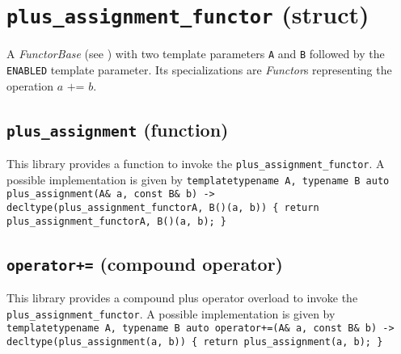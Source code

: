 
\section{\texttt{plus\_assignment\_functor} (struct)}
A \textit{FunctorBase} (see \cite{functors}) with two template parameters \texttt{A} and \texttt{B} followed by the \texttt{ENABLED} template parameter.
Its specializations are \textit{Functor}s representing the operation $\textit{a += b}$.

\subsection{\texttt{plus\_assignment} (function)}
This library provides a function to invoke the \texttt{plus\_assignment\_functor}.
A possible implementation is given by\newline
\texttt{template\textlangle typename A, typename B\textrangle\newline
auto\newline
plus\_assignment(A\& a, const B\& b)\newline
-> decltype(plus\_assignment\_functor\textlangle A, B\textrangle()(a, b))\newline
\{ return plus\_assignment\_functor\textlangle A, B\textrangle()(a, b); \}}

\subsection{\texttt{operator+=} (compound operator)}
This library provides a compound plus operator overload to invoke the \texttt{plus\_assignment\_functor}.
A possible implementation is given by\newline
\texttt{template\textlangle typename A, typename B\textrangle\newline
auto\newline
operator+=(A\& a, const B\& b)\newline
-> decltype(plus\_assignment(a, b))\newline
\{ return plus\_assignment(a, b); \}}
